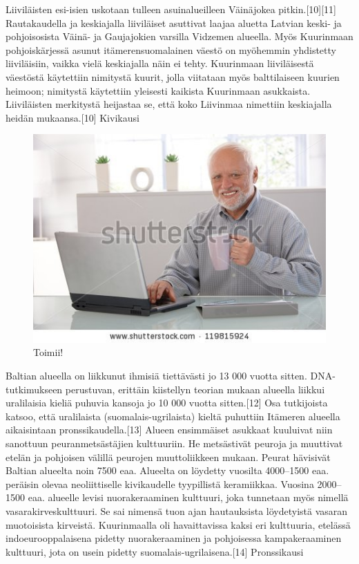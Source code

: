 \documentclass[a4paper]{article}
\theoremstyle{definition}
\theoremstyle{remark}
\begin{document}
Liiviläisten esi-isien uskotaan tulleen asuinalueilleen Väinäjokea pitkin.[10][11] Rautakaudella ja keskiajalla liiviläiset asuttivat laajaa aluetta Latvian keski- ja pohjoisosista Väinä- ja Gaujajokien varsilla Vidzemen alueella. Myös Kuurinmaan pohjoiskärjessä asunut itämerensuomalainen väestö on myöhemmin yhdistetty liiviläisiin, vaikka vielä keskiajalla näin ei tehty. Kuurinmaan liiviläisestä väestöstä käytettiin nimitystä kuurit, jolla viitataan myös balttilaiseen kuurien heimoon; nimitystä käytettiin yleisesti kaikista Kuurinmaan asukkaista.  Liiviläisten merkitystä heijastaa se, että koko Liivinmaa nimettiin keskiajalla heidän mukaansa.[10]
Kivikausi
\begin{figure} [pbt]
	\includegraphics[scale=1.5]{OldGuy}
	\caption{Toimii!}
	\label{harold}
\end{figure}
Baltian alueella on liikkunut ihmisiä tiettävästi jo 13 000 vuotta sitten. DNA-tutkimukseen perustuvan, erittäin kiistellyn teorian mukaan alueella liikkui uralilaisia kieliä puhuvia kansoja jo 10 000 vuotta sitten.[12] Osa tutkijoista katsoo, että uralilaista (suomalais-ugrilaista) kieltä puhuttiin Itämeren alueella aikaisintaan pronssikaudella.[13] Alueen ensimmäiset asukkaat kuuluivat niin sanottuun peuranmetsästäjien kulttuuriin. He metsästivät peuroja ja muuttivat etelän ja pohjoisen välillä peurojen muuttoliikkeen mukaan. Peurat hävisivät Baltian alueelta noin 7500 eaa. Alueelta on löydetty vuosilta 4000–1500 eaa. peräisin olevaa neoliittiselle kivikaudelle tyypillistä keramiikkaa. Vuosina 2000–1500 eaa. alueelle levisi nuorakeraaminen kulttuuri, joka tunnetaan myös nimellä vasarakirveskulttuuri. Se sai nimensä tuon ajan hautauksista löydetyistä vasaran muotoisista kirveistä. Kuurinmaalla oli havaittavissa kaksi eri kulttuuria, etelässä indoeurooppalaisena pidetty nuorakeraaminen ja pohjoisessa kampakeraaminen kulttuuri, jota on usein pidetty suomalais-ugrilaisena.[14]
Pronssikausi
\end{document}
